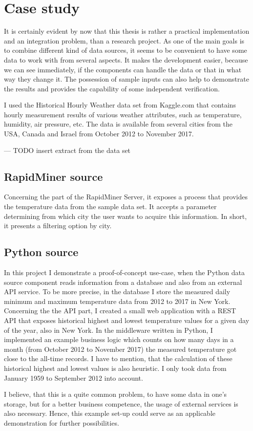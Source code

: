 \chapter{Case study}

It is certainly evident by now that this thesis is rather a practical implementation and an integration problem, than a research project. As one of the main goals is to combine different kind of data sources, it seems to be convenient to have some data to work with from several aspects. It makes the development easier, because we can see immediately, if the components can handle the data or that in what way they change it. The possession of sample inputs can also help to demonstrate the results and provides the capability of some independent verification.

I used the Historical Hourly Weather data set from Kaggle.com that contains hourly measurement results of various weather attributes, such as temperature, humidity, air pressure, etc. The data is available from several cities from the USA, Canada and Israel from October 2012 to November 2017.

\begin{center}
	--- TODO insert extract from the data set
\end{center}

\section{RapidMiner source}

Concerning the part of the RapidMiner Server, it exposes a process that provides the temperature data from the sample data set. It accepts a parameter determining from which city the user wants to acquire this information. In short, it presents a filtering option by city.

\section{Python source} \label{case-study-python-source}

In this project I demonstrate a proof-of-concept use-case, when the Python data source component reads information from a database and also from an external API service. To be more precise, in the database I store the measured daily minimum and maximum temperature data from 2012 to 2017 in New York. Concerning the the API part, I created a small web application with a REST API that exposes historical highest and lowest temperature values for a given day of the year, also in New York. In the middleware written in Python, I implemented an example business logic which counts on how many days in a month (from October 2012 to November 2017) the measured temperature got close to the all-time records. I have to mention, that the calculation of these historical highest and lowest values is also heuristic. I only took data from January 1959 to September 2012 into account.

I believe, that this is a quite common problem, to have some data in one's storage, but for a better business competence, the usage of external services is also necessary. Hence, this example set-up could serve as an applicable demonstration for further possibilities.